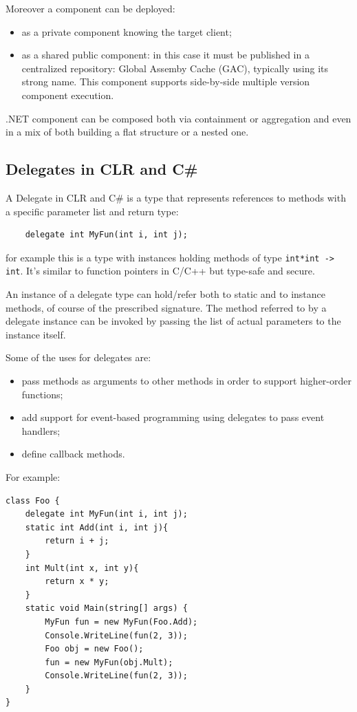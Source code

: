 Moreover a component can be deployed:
\begin{itemize}
    \item as a private component knowing the target client;
    \item as a shared public component: in this case it must be published in a centralized repository: Global Assemby Cache (GAC), typically using its strong name.
    This component supports side-by-side multiple version component execution.
\end{itemize}

.NET component can be composed both via containment or aggregation and even in a mix of both building a flat structure or a nested one.

\subsection{Delegates in CLR and C\#}
A Delegate in CLR and C\# is a type that represents references to methods with a specific parameter list and return type:
\begin{verbatim}
    delegate int MyFun(int i, int j);
\end{verbatim}
for example this is a type with instances holding methods of type \verb|int*int -> int|.
It's similar to function pointers in C/C++ but type-safe and secure.

An instance of a delegate type can hold/refer both to static and to instance methods, of course of the prescribed signature.
The method referred to by a delegate instance can be invoked by passing the list of actual parameters to the instance itself.

Some of the uses for delegates are:
\begin{itemize}
    \item pass methods as arguments to other methods in order to support higher-order functions;
    \item add support for event-based programming using delegates to pass event handlers;
    \item define callback methods.
\end{itemize}
For example:
\begin{verbatim}
class Foo {
    delegate int MyFun(int i, int j);
    static int Add(int i, int j){
        return i + j;
    }
    int Mult(int x, int y){
        return x * y;
    }
    static void Main(string[] args) {
        MyFun fun = new MyFun(Foo.Add);
        Console.WriteLine(fun(2, 3));
        Foo obj = new Foo();
        fun = new MyFun(obj.Mult);
        Console.WriteLine(fun(2, 3));
    }
}
\end{verbatim}

